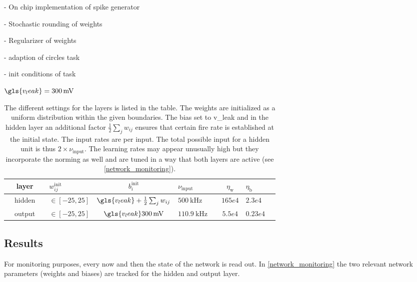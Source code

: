 - On chip implementation of spike generator

- Stochastic rounding of weights

- Regularizer of weights

- adaption of circles task 

- init conditions of task




%

$\gls{v_leak} = \SI{300}{\milli \V}$
\begin{table}\centering{}
	\begin{tabular}{@{}rcllcllcll@{}}\toprule
		&layer	 & & $w_{ij}^\text{init}$		& $b_i^\text{init}$ & $\nu_{\text{input}}$	& & $\eta_\text{w}$	& $\eta_\text{b}$\\ \midrule
		&hidden  & & $\in[-25, 25]$	& $\gls{v_leak} +\frac{1}{2} \sum_j w_{ij}$ & $\SI{500}{\kilo \Hz}$	& & $165e4$			& $2.3e4$		\\
		&output  & & $\in[-25, 25]$	& $\gls{v_leak} \SI{300}{\milli \V}$& $\SI{110.9}{\kilo\Hz}$& & $5.5e4$			& $0.23e4$		\\ \bottomrule
\end{tabular}
\caption{The different settings for the layers is listed in the table. The weights are initialized as a uniform distribution within the given boundaries. The bias set to \gls{v_leak} and in the hidden layer an additional factor $\frac{1}{2} \sum_j w_{ij}$ ensures that certain fire rate is established at the initial state. The input rates are per input. The total possible input for a hidden unit is thus $2 \times \nu_\text{input}$. The learning rates may appear unusually high but they incorporate the norming as well and are tuned in a way that both layers are active (see \cref{network_monitoring}).}
\end{table}

\subsection{Results}

For monitoring purposes, every now and then the state of the network is read out. In \cref{network_monitoring} the two relevant network parameters (weights and biases) are tracked for the hidden and output layer.

